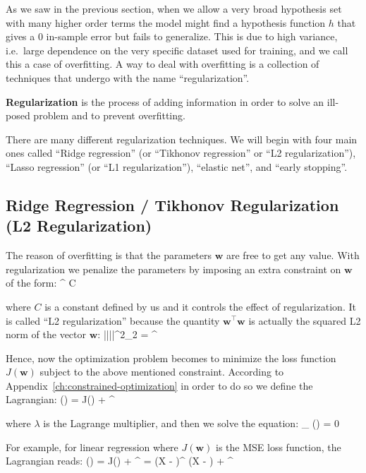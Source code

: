 As we saw in the previous section, when we allow a very broad hypothesis set with many higher order terms the model
might find a hypothesis function $h$ that gives a 0 in-sample error but fails to generalize. This is due to high
variance, i.e.\ large dependence on the very specific dataset used for training, and we call this a case of
overfitting. A way to deal with overfitting is a collection of techniques that undergo with the name
``regularization''.

\bd[Regularization]
\textbf{Regularization} is the process of adding information in order to solve an ill-posed problem and to prevent
overfitting.
\ed

There are many different regularization techniques. We will begin with four main ones called ``Ridge regression''
(or ``Tikhonov regression'' or ``L2 regularization''), ``Lasso regression'' (or ``L1 regularization''),
``elastic net'', and ``early stopping''.

\subsection{Ridge Regression / Tikhonov Regularization (L2 Regularization)}

The reason of overfitting is that the parameters $\boldsymbol{w}$ are free to get any value. With regularization we
penalize the parameters by imposing an extra constraint on $\boldsymbol{w}$ of the form:
\bse
{}^{\intercal}  \leq C
\ese

where $C$ is a constant defined by us and it controls the effect of regularization. It is called ``L2
regularization'' because the quantity $\boldsymbol{w}^{\intercal} \boldsymbol{w}$ is actually the squared L2 norm of
the vector $\boldsymbol{w}$:
\bse
||||^2_2 = ^{\intercal} 
\ese

Hence, now the optimization problem becomes to minimize the loss function $J (\boldsymbol{w})$ subject to the above
mentioned constraint. According to Appendix~\ref{ch:constrained-optimization} in order to do so we define the
Lagrangian:
\bse
{} () = J() +  ^{\intercal} 
\ese

where $\lambda$ is the Lagrange multiplier, and then we solve the equation:
\bse
\nabla_{}  () = 0
\ese

For example, for linear regression where $J(\boldsymbol{w})$ is the MSE loss function, the Lagrangian reads:
{\setlength{\jot}{10pt}
\bse
{} () = J() +  ^{\intercal} 
=  (X  - )^{\intercal} (X  - ) + 
^{\intercal} 
\ese}

